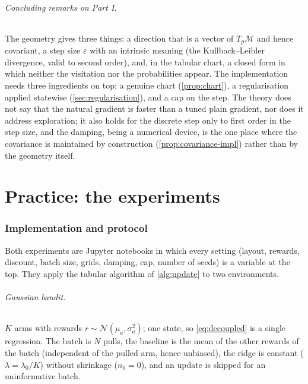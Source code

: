 \documentclass[11pt,a4paper]{article}
\numberwithin{equation}{section}
\theoremstyle{plain}
\theoremstyle{definition}
\theoremstyle{remark}
\newcommand{\mani}{\mathcal{M}}
\begin{document}
\paragraph{Concluding remarks on Part I.}
The geometry gives three things: a direction that is a vector of $T_p\mani$ and hence covariant, a step size $\varepsilon$ with an intrinsic meaning (the Kullback--Leibler divergence, valid to second order), and, in the tabular chart,
a closed form in which neither the visitation nor the probabilities appear. The implementation needs three ingredients on top: a genuine chart (\cref{prop:chart}), a regularisation applied statewise
(\cref{sec:regularisation}), and a cap on the step. The theory does not say that the natural gradient is faster than a tuned plain gradient, nor does it address exploration; it also holds for the discrete step only to first order in the step size,
and the damping, being a numerical device, is the one place where the covariance is maintained by construction (\cref{prop:covariance-impl}) rather than by the geometry itself.

\part{Practice: the experiments}

\section{Implementation and protocol}\label{sec:protocol}

Both experiments are Jupyter notebooks in which every setting (layout, rewards, discount, batch size, grids, damping, cap, number of seeds) is a variable at the top. They apply the tabular algorithm of \cref{alg:update} to two environments.

\paragraph{Gaussian bandit.}
$K$ arms with rewards $r\sim\mathcal N(\mu_a,\sigma_a^2)$; one state, so \eqref{eq:decoupled} is a single regression. The batch is $N$ pulls, the baseline is the mean of the other rewards of the batch (independent of the pulled arm, hence unbiased), the
ridge is constant ($\lambda=\lambda_0/K$) without shrinkage ($n_0=0$), and an update is skipped for an uninformative batch.
\end{document}
